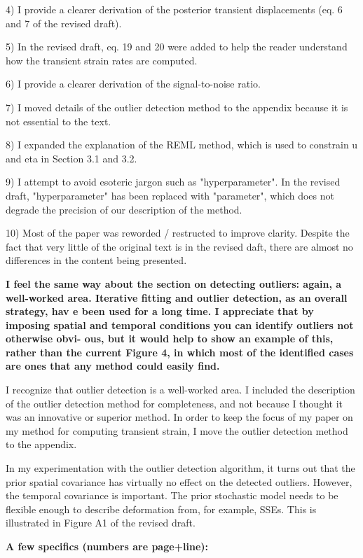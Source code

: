\documentclass[10pt,a4paper]{letter}
\begin{document}
\begin{letter}{}
  4) I provide a clearer derivation of the posterior transient
     displacements (eq. 6 and 7 of the revised draft). 
  
  5) In the revised draft, eq. 19 and 20 were added to help the reader
     understand how the transient strain rates are computed.

  6) I provide a clearer derivation of the signal-to-noise ratio.
  
  7) I moved details of the outlier detection method to the appendix
     because it is not essential to the text.

  8) I expanded the explanation of the REML method, which is used to
     constrain u and eta in Section 3.1 and 3.2.

  9) I attempt to avoid esoteric jargon such as "hyperparameter". In
     the revised draft, "hyperparameter" has been replaced with
     "parameter", which does not degrade the precision of our
     description of the method.
  
  10) Most of the paper was reworded / restructed to improve
     clarity. Despite the fact that very little of the original text
     is in the revised daft, there are almost no differences in the
     content being presented.
 

\textbf{I feel the same way about the section on detecting outliers: again, a
well-worked area. Iterative fitting and outlier detection, as an
overall strategy, hav e been used for a long time. I appreciate that
by imposing spatial and temporal conditions you can identify outliers
not otherwise obvi- ous, but it would help to show an example of this,
rather than the current Figure 4, in which most of the identified
cases are ones that any method could easily find.}

I recognize that outlier detection is a well-worked area. I included
the description of the outlier detection method for completeness, and
not because I thought it was an innovative or superior method. In
order to keep the focus of my paper on my method for computing
transient strain, I move the outlier detection method to the appendix.

In my experimentation with the outlier detection algorithm, it turns
out that the prior spatial covariance has virtually no effect on the
detected outliers. However, the temporal covariance is important. The
prior stochastic model needs to be flexible enough to describe
deformation from, for example, SSEs. This is illustrated in Figure A1
of the revised draft.

\textbf{A few specifics (numbers are page+line):}


\end{letter}
\end{document}

